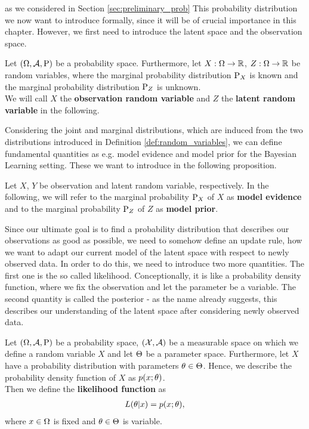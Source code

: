 as we considered in Section \ref{sec:preliminary_prob}
This probability distribution we now want to introduce formally, since it will be of crucial importance in this chapter. However, we first need to introduce the latent space and the observation space.

\begin{definition}\label{def:random_variables}
Let $(\Omega, \operatorname{\mathcal{A}}, \operatorname{\text{P}})$ be a probability space. Furthermore, let $X:\Omega\to\operatorname{\mathbb{R}}$, $Z:\Omega\to\operatorname{\mathbb{R}}$ be random variables, where the marginal probability distribution $\operatorname{\text{P}}_X$ is known and the marginal probability distribution $\operatorname{\text{P}}_Z$ is unknown.\\
We will call $X$ the \textbf{observation random variable} and $Z$ the \textbf{latent random variable} in the following.
\end{definition}

Considering the joint and marginal distributions, which are induced from the two distributions introduced in Definition \ref{def:random_variables}, we can define fundamental quantities as e.g. model evidence and model prior for the Bayesian Learning setting. These we want to introduce in the following proposition.

\begin{proposition}
Let $X$, $Y$ be observation and latent random variable, respectively. In the following, we will refer to the marginal probability $\operatorname{\text{P}}_X$ of $X$ as \textbf{model evidence} and to the marginal probability $\operatorname{\text{P}}_Z$ of $Z$ as \textbf{model prior}.
\end{proposition}

Since our ultimate goal is to find a probability distribution that describes our observations as good as possible, we need to somehow define an update rule, how we want to adapt our current model of the latent space with respect to newly observed data. In order to do this, we need to introduce two more quantities. The first one is the so called likelihood. Conceptionally, it is like a probability density function, where we fix the observation and let the parameter be a variable. The second quantity is called the posterior - as the name already suggests, this describes our understanding of the latent space after considering newly observed data.

\begin{definition}\label{def:likelihood}
Let $(\Omega,\operatorname{\mathcal{A}}, \operatorname{\text{P}})$ be a probability space, $(\mathcal{X}, \operatorname{\mathcal{A}})$ be a measurable space on which we define a random variable $X$ and let $\operatorname{\Theta}$ be a parameter space. Furthermore, let $X$ have a probability distribution with parameters $\theta\in\operatorname{\Theta}$. Hence, we describe the probability density function of $X$ as $p(x;\theta)$.\\
Then we define the \textbf{likelihood function} as
\begin{align*}
L(\theta | x) = p(x; \theta),
\end{align*}
where $x\in\Omega$ is fixed and $\theta\in\operatorname{\Theta}$ is variable.
\end{definition}

